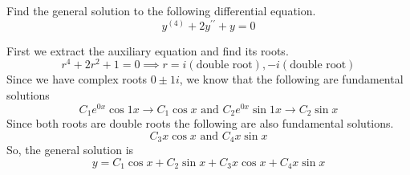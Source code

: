 \begin{example}
	Find the general solution to the following differential equation.
	\begin{equation*}
		y^{(4)} + 2y^{\prime\prime} + y = 0
	\end{equation*}
\end{example}
First we extract the auxiliary equation and find its roots.
\begin{equation*}
	r^4 + 2r^2 + 1 = 0 \implies r = i (\text{double root}), -i (\text{double root})
\end{equation*}
Since we have complex roots $0 \pm 1i$, we know that the following are fundamental solutions
\begin{equation*}
	C_1e^{0x}\cos{1x} \to C_1\cos{x} \text{ and } C_2e^{0x}\sin{1x} \to C_2\sin{x}
\end{equation*}
Since both roots are double roots the following are also fundamental solutions.
\begin{equation*}
	C_3x\cos{x} \text{ and } C_4x\sin{x}
\end{equation*}
So, the general solution is
\begin{equation*}
	y = C_1\cos{x} + C_2\sin{x} + C_3x\cos{x} + C_4x\sin{x}
\end{equation*}